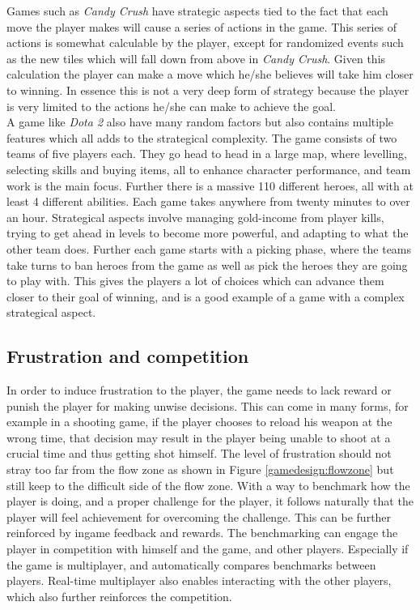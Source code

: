 Games such as \textit{Candy Crush}\cite{candycrush} have strategic aspects tied to the fact that each move the player makes will cause a series of actions in the game.
This series of actions is somewhat calculable by the player, except for randomized events such as the new tiles which will fall down from above in \textit{Candy Crush}.
Given this calculation the player can make a move which he/she believes will take him closer to winning.
In essence this is not a very deep form of strategy because the player is very limited to the actions he/she can make to achieve the goal.\\
A game like \textit{Dota 2}\cite{Dota2} also have many random factors but also contains multiple features which all adds to the strategical complexity.
The game consists of two teams of five players each. 
They go head to head in a large map, where levelling, selecting skills and buying items, all to enhance character performance, and team work is the main focus. 
Further there is a massive 110 different heroes, all with at least 4 different abilities. 
Each game takes anywhere from twenty minutes to over an hour. 
Strategical aspects involve managing gold-income from player kills, trying to get ahead in levels to become more powerful, and adapting to what the other team does. 
Further each game starts with a picking phase, where the teams take turns to ban heroes from the game as well as pick the heroes they are going to play with.
This gives the players a lot of choices which can advance them closer to their goal of winning, and is a good example of a game with a complex strategical aspect.

\subsection{Frustration and competition}
In order to induce frustration to the player, the game needs to lack reward or punish the player for making unwise decisions.
This can come in many forms, for example in a shooting game, if the player chooses to reload his weapon at the wrong time, that decision may result in the player being unable to shoot at a crucial time and thus getting shot himself.
The level of frustration should not stray too far from the flow zone as shown in Figure \ref{gamedesign:flowzone} but still keep to the difficult side of the flow zone. 
With a way to benchmark how the player is doing, and a proper challenge for the player, it follows naturally that the player will feel achievement for overcoming the challenge.
This can be further reinforced by ingame feedback and rewards.
The benchmarking can engage the player in competition with himself and the game, and other players.
Especially if the game is multiplayer, and automatically compares benchmarks between players.
Real-time multiplayer also enables interacting with the other players, which also further reinforces the competition.

